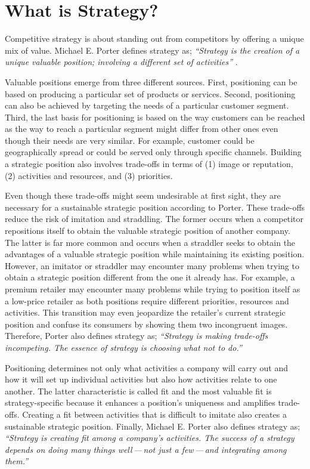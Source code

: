 \chapter{What is Strategy?}\label{ch:ekg-mm-what-is-strategy}

Competitive strategy is about standing out from competitors by offering a unique mix of value.
Michael E. Porter defines strategy as;
\textit{“Strategy is the creation of a unique valuable position; involving a different set of activities”}
\autocite{what_is_strategy}.

Valuable positions emerge from three different sources.
First, positioning can be based on producing a particular set of products or services.
Second, positioning can also be achieved by targeting the needs of a particular customer segment.
Third, the last basis for positioning is based on the way customers can be reached as the way to reach a
particular segment might differ from other ones even though their needs are very similar.
For example, customer could be geographically spread or could be served only through specific channels.
Building a strategic position also involves trade-offs in terms of
(1) image or reputation,
(2) activities and resources, and
(3) priorities.

Even though these trade-offs might seem undesirable at first sight,
they are necessary for a sustainable strategic position according to Porter.
These trade-offs reduce the risk of imitation and straddling.
The former occurs when a competitor repositions itself to obtain the valuable strategic position of another company.
The latter is far more common and occurs when a straddler seeks to obtain the advantages of
a valuable strategic position while maintaining its existing position.
However, an imitator or straddler may encounter many problems when trying to obtain a strategic position
different from the one it already has.
For example, a premium retailer may encounter many problems while trying to position itself as a low-price retailer
as both positions require different priorities, resources and activities.
This transition may even jeopardize the retailer's current strategic position and confuse its consumers
by showing them two incongruent images.
Therefore, Porter also defines strategy as;
\textit{“Strategy is making trade-offs incompeting. The essence of strategy is choosing what not to do.”}

Positioning determines not only what activities a company will carry out and how it will set up individual
activities but also how activities relate to one another.
The latter characteristic is called fit and the most valuable fit is strategy-specific because it enhances a
position’s uniqueness and amplifies trade-offs.
Creating a fit between activities that is difficult to imitate also creates a sustainable strategic position.
Finally, Michael E. Porter also defines strategy as;
\textit{“Strategy is creating fit among a company’s activities.
The success of a strategy depends on doing many things well\,---\,not just a few\,---\,and
integrating among them.”}



